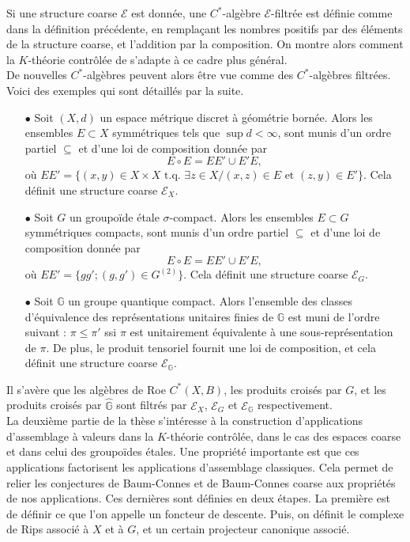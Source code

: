 Si une structure coarse $\mathcal E$ est donnée, une $C^*$-algèbre $\mathcal E$-filtrée est définie comme dans la définition précédente, en remplaçant les nombres positifs par des éléments de la structure coarse, et l'addition par la composition. On montre alors comment la $K$-théorie contrôlée de \cite{OY2} s'adapte à ce cadre plus général.\\

De nouvelles $C^*$-algèbres peuvent alors être vue comme des $C^*$-algèbres filtrées. Voici des exemples qui sont détaillés par la suite.
\begin{itemize} 
\item[$\bullet$] Soit $(X,d)$ un espace métrique discret à géométrie bornée. Alors les ensembles $E\subset X$ symmétriques tels que $\sup d<\infty$, sont munis d'un ordre partiel $\subseteq$ et d'une loi de composition donnée par 
\[E\circ E = EE'\cup E'E,\]
où $EE' = \{(x,y)\in X\times X \text{ t.q. }\exists z\in X / (x,z)\in E \text{ et }(z,y)\in E'\}$. Cela définit une structure coarse $\mathcal E_X$.
\item[$\bullet$] Soit $G$ un groupoïde étale $\sigma$-compact. Alors les ensembles $E\subset G$ symmétriques compacts, sont munis d'un ordre partiel $\subseteq$ et d'une loi de composition donnée par 
\[E\circ E = EE'\cup E'E,\]
où $EE' = \{gg' ; (g,g')\in G^{(2)}\}$. Cela définit une structure coarse $\mathcal E_G$.
\item[$\bullet$] Soit $\mathbb G$ un groupe quantique compact. Alors l'ensemble des classes d'équivalence des représentations unitaires finies de $\mathbb G$ est muni de l'ordre suivant : $\pi\leq \pi'$ ssi $\pi$ est unitairement équivalente à une sous-représentation de $\pi$. De plus, le produit tensoriel fournit une loi de composition, et cela définit une structure coarse $\mathcal E_{\mathbb G}$.\\
\end{itemize} 

Il s'avère que les algèbres de Roe $C^*(X,B)$, les produits croisés par $G$, et les produits croisés par $\hat{\mathbb G}$ sont filtrés par $\mathcal E_X$, $\mathcal E_G$ et $\mathcal E_{\mathbb G}$ respectivement.\\


La deuxième partie de la thèse s'intéresse à la construction d'applications d'assemblage à valeurs dans la $K$-théorie contrôlée, dans le cas des espaces coarse et dans celui des groupoïdes étales. Une propriété importante est que ces applications factorisent les applications d'assemblage classiques. Cela permet de relier les conjectures de Baum-Connes et de Baum-Connes coarse aux propriétés de nos applications. Ces dernières sont définies en deux étapes. La première est de définir ce que l'on appelle un foncteur de descente. Puis, on définit le complexe de Rips associé à $X$ et à $G$, et un certain projecteur canonique associé. \\

